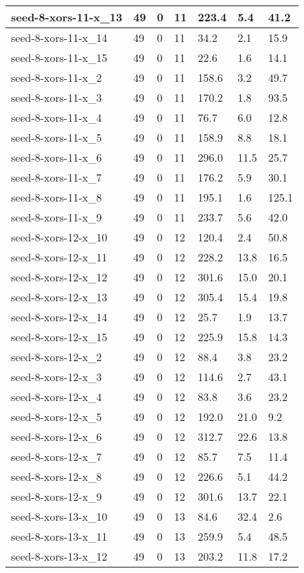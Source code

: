 \begin{scriptsize}
\begin{longtable}{|p{5cm}|l|l|l|l|l|l|}
seed-8-xors-11-x\_13&49&0&11&223.4&5.4&41.2 \\ \hline 
seed-8-xors-11-x\_14&49&0&11&34.2&2.1&15.9 \\ \hline 
seed-8-xors-11-x\_15&49&0&11&22.6&1.6&14.1 \\ \hline 
seed-8-xors-11-x\_2&49&0&11&158.6&3.2&49.7 \\ \hline 
seed-8-xors-11-x\_3&49&0&11&170.2&1.8&93.5 \\ \hline 
seed-8-xors-11-x\_4&49&0&11&76.7&6.0&12.8 \\ \hline 
seed-8-xors-11-x\_5&49&0&11&158.9&8.8&18.1 \\ \hline 
seed-8-xors-11-x\_6&49&0&11&296.0&11.5&25.7 \\ \hline 
seed-8-xors-11-x\_7&49&0&11&176.2&5.9&30.1 \\ \hline 
seed-8-xors-11-x\_8&49&0&11&195.1&1.6&125.1 \\ \hline 
seed-8-xors-11-x\_9&49&0&11&233.7&5.6&42.0 \\ \hline 
seed-8-xors-12-x\_10&49&0&12&120.4&2.4&50.8 \\ \hline 
seed-8-xors-12-x\_11&49&0&12&228.2&13.8&16.5 \\ \hline 
seed-8-xors-12-x\_12&49&0&12&301.6&15.0&20.1 \\ \hline 
seed-8-xors-12-x\_13&49&0&12&305.4&15.4&19.8 \\ \hline 
seed-8-xors-12-x\_14&49&0&12&25.7&1.9&13.7 \\ \hline 
seed-8-xors-12-x\_15&49&0&12&225.9&15.8&14.3 \\ \hline 
seed-8-xors-12-x\_2&49&0&12&88.4&3.8&23.2 \\ \hline 
seed-8-xors-12-x\_3&49&0&12&114.6&2.7&43.1 \\ \hline 
seed-8-xors-12-x\_4&49&0&12&83.8&3.6&23.2 \\ \hline 
seed-8-xors-12-x\_5&49&0&12&192.0&21.0&9.2 \\ \hline 
seed-8-xors-12-x\_6&49&0&12&312.7&22.6&13.8 \\ \hline 
seed-8-xors-12-x\_7&49&0&12&85.7&7.5&11.4 \\ \hline 
seed-8-xors-12-x\_8&49&0&12&226.6&5.1&44.2 \\ \hline 
seed-8-xors-12-x\_9&49&0&12&301.6&13.7&22.1 \\ \hline 
seed-8-xors-13-x\_10&49&0&13&84.6&32.4&2.6 \\ \hline 
seed-8-xors-13-x\_11&49&0&13&259.9&5.4&48.5 \\ \hline 
seed-8-xors-13-x\_12&49&0&13&203.2&11.8&17.2 \\ \hline 

\end{longtable}
\end{scriptsize}
